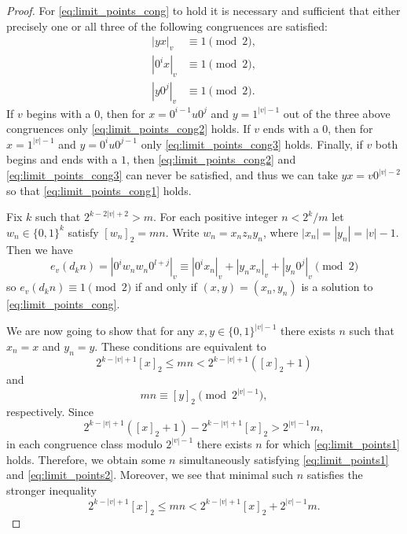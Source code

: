 \documentclass[a4paper,11pt]{amsart}
\theoremstyle{definition}
\begin{document}
\begin{proof}
For \eqref{eq:limit_points_cong} to hold it is necessary and sufficient that either precisely one or all three of the following congruences are satisfied:
\begin{align}
|y x|_{v} &\equiv 1 \pmod{2}, \label{eq:limit_points_cong1} \\
|0^i x|_{v} &\equiv 1 \pmod{2}, \label{eq:limit_points_cong2} \\
|y 0^j|_{v} &\equiv 1 \pmod{2}. \label{eq:limit_points_cong3}
\end{align}
If $v$ begins with a $0$, then for $x = 0^{i-1} u 0^j$ and $y=1^{|v|-1}$ out of the three above congruences only \eqref{eq:limit_points_cong2} holds. If $v$ ends with a $0$, then for $x = 1^{|v|-1}$ and $y=0^i u 0^{j-1}$ only \eqref{eq:limit_points_cong3} holds. Finally, if $v$ both begins and ends with a $1$, then  \eqref{eq:limit_points_cong2} and \eqref{eq:limit_points_cong3} can never be satisfied, and thus we can take $yx = v0^{|v|-2}$ so that \eqref{eq:limit_points_cong1} holds.

Fix $k$ such that $2^{k-2|v|+2} > m$. For each positive integer $n < 2^k/m$ let $w_n \in \{0,1\}^{k}$ satisfy $[w_n]_2 = mn$.  Write $w_n = x_n z_n y_n$, where $|x_n| = |y_n| = |v|-1$.
Then we have 
$$  e_{v}(d_kn) = |0^i w_n w_n  0^{l+j}|_{v} \equiv |0^i x_n|_{v} + |y_n x_n|_{v} + |y_n 0^j|_{v} \pmod{2} $$
so $e_{v}(d_kn) \equiv 1 \pmod{2}$ if and only if $(x,y) = (x_n,y_n)$ is a solution to \eqref{eq:limit_points_cong}. 

We are now going to show that for any $x,y \in \{0,1\}^{|v|-1}$ there exists $n$ such that $x_n=x$ and $y_n=y$. These conditions are equivalent to
\begin{equation} \label{eq:limit_points1}
2^{k -|v|+1}[x]_2 \leq  mn  < 2^{k -|v|+1}([x]_2+1)
\end{equation}
and
\begin{equation} \label{eq:limit_points2}
mn \equiv [y]_2 \pmod{2^{|v|-1}},
\end{equation}
respectively. Since
$$ 2^{k -|v|+1}([x]_2+1) - 2^{k -|v|+1}[x]_2 > 2^{|v|-1}m, $$
in each congruence class modulo $2^{|v|-1}$ there exists $n$ for which \eqref{eq:limit_points1} holds. Therefore, we obtain some $n$ simultaneously satisfying \eqref{eq:limit_points1} and \eqref{eq:limit_points2}. Moreover, we see that minimal such $n$ satisfies the stronger inequality
\begin{equation} \label{eq:limit_points3}
2^{k -|v|+1}[x]_2 \leq  mn  < 2^{k -|v|+1}[x]_2 + 2^{|v|-1}m.
\end{equation}


\end{proof}
\end{document}
